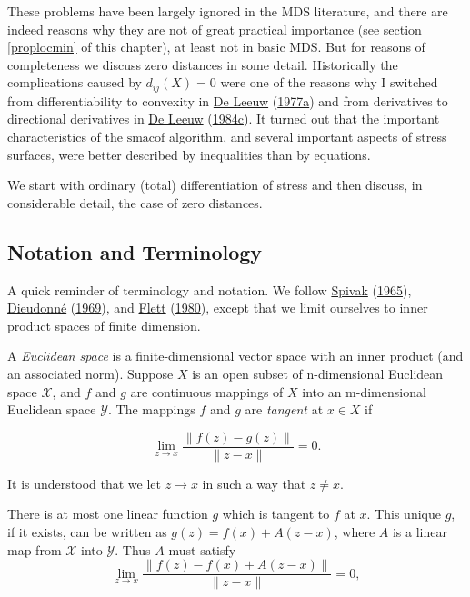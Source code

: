 \documentclass[
  12pt,
]{book}
\theoremstyle{definition}
\theoremstyle{definition}
\theoremstyle{definition}
\theoremstyle{definition}
\theoremstyle{remark}
\begin{document}
These problems have been largely ignored in the MDS literature, and there are indeed reasons why they are not of great practical importance (see section \ref{proplocmin} of this chapter), at least not in basic MDS. But for reasons of completeness we discuss zero distances in some detail. Historically the complications caused by \(d_{ij}(X)=0\) were one of the reasons why I switched from differentiability to convexity in \protect\hyperlink{ref-deleeuw_C_77}{De Leeuw} (\protect\hyperlink{ref-deleeuw_C_77}{1977a}) and from derivatives to directional derivatives in \protect\hyperlink{ref-deleeuw_A_84f}{De Leeuw} (\protect\hyperlink{ref-deleeuw_A_84f}{1984c}). It turned out that the important characteristics of the \(\textrm{smacof}\) algorithm, and several important aspects of stress surfaces, were better described by inequalities than by equations.

We start with ordinary (total) differentiation of stress and then discuss, in considerable detail, the case of zero distances.

\hypertarget{notation-and-terminology}{%
\subsection{Notation and Terminology}\label{notation-and-terminology}}

A quick reminder of terminology and notation. We follow \protect\hyperlink{ref-spivak_65}{Spivak} (\protect\hyperlink{ref-spivak_65}{1965}), \protect\hyperlink{ref-dieudonne_69}{Dieudonné} (\protect\hyperlink{ref-dieudonne_69}{1969}), and \protect\hyperlink{ref-flett_80}{Flett} (\protect\hyperlink{ref-flett_80}{1980}), except that we limit ourselves to inner product spaces of finite dimension.

A \emph{Euclidean space} is a finite-dimensional vector space with an inner product (and an associated norm). Suppose \(X\) is an open subset of n-dimensional Euclidean space \(\mathcal{X}\), and \(f\) and \(g\) are continuous mappings of \(X\) into an m-dimensional Euclidean space \(\mathcal{Y}\). The mappings \(f\) and \(g\) are \emph{tangent} at \(x\in X\) if

\begin{equation}
\lim_{z\rightarrow x}\frac{\|f(z)-g(z)\|}{\|z-x\|}=0.
\label{eq:proptangent}
\end{equation}

It is understood that we let \(z\rightarrow x\) in such a way that \(z\not=x\).

There is at most one linear function \(g\) which is tangent to \(f\) at \(x\). This unique \(g\), if it exists, can be written as \(g(z)=f(x)+A(z-x)\), where \(A\) is a linear map from \(\mathcal{X}\) into \(\mathcal{Y}\). Thus \(A\) must satisfy
\begin{equation}
\lim_{z\rightarrow x}\frac{\|f(z)-f(x)+A(z-x)\|}{\|z-x\|}=0,
\label{eq:proplintangent1}
\end{equation}
\end{document}
